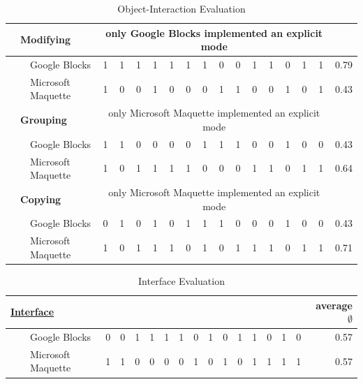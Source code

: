 \documentclass{report}
\begin{document}
\begin{table}[H]
\begin{center}
\begin{tabular}{@{}|lll|llllllllllllll|r|@{}}
				& \multicolumn{2}{l|}{\textbf{Modifying}} & \multicolumn{14}{c|}{\small{only Google Blocks implemented an explicit mode}} &\\ \hline
				& & Google Blocks & 1 & 1 & 1 & 1 & 1 & 1 & 1 & 0 & 0 & 1 & 1 & 0 & 1 & 1 & 0.79\\
				& & Microsoft Maquette & 1 & 0 & 0 & 1 & 0 & 0 & 0 & 1 & 1 & 0 & 0 & 1 & 0 & 1 & 0.43 \\ \hline

				& \multicolumn{2}{l|}{\textbf{Grouping}} & \multicolumn{14}{c|}{\small{only Microsoft Maquette implemented an explicit mode}} &\\ \hline
				& & Google Blocks & 1 & 1 & 0 & 0 & 0 & 0& 1 & 1 & 1 & 0 & 0 & 1 & 0 & 0 & 0.43 \\
				& & Microsoft Maquette & 1 & 0 & 1 & 1 & 1 & 1 & 0 & 0 & 0 & 1 & 1 & 0 & 1 & 1 & 0.64 \\ \hline				
				
				& \multicolumn{2}{l|}{\textbf{Copying}} & \multicolumn{14}{c|}{\small{only Microsoft Maquette implemented an explicit mode}} &\\ \hline
				& & Google Blocks & 0 & 1 & 0 & 1 & 0 & 1 & 1 & 1 & 0 & 0 & 0 & 1 & 0 & 0 & 0.43 \\
				& & Microsoft Maquette & 1 & 0 & 1 & 1 & 1 & 0 & 1 & 0 & 1 & 1 & 1 & 0 & 1 & 1 & 0.71 \\ \hline
			\end{tabular}
			\caption{Object-Interaction Evaluation}
			\label{tab:InteractionEvaluation}
			\end{center}				
		\end{table}
		
		\begin{table}[H]
			\begin{center}
			\begin{tabular}{@{}|lll|llllllllllllll|r|@{}}
				\hline
				\multicolumn{3}{|l|}{\textbf{\underline{Interface}}} & & & & & & & & & & & & & & & \textbf{average $\emptyset$} \\ \hline
				& & Google Blocks & 0 & 0 & 1 & 1 & 1 & 1 & 0 & 1 & 0 & 1 & 1 & 0 & 1 & 0 & 0.57 \\
				& & Microsoft Maquette & 1 & 1 & 0 & 0 & 0 & 0 & 1 & 0 & 1 & 0 & 1 & 1 & 1 & 1 & 0.57 \\ \hline
			\end{tabular}
			\caption{Interface Evaluation}
			\label{tab:InterfaceEvaluation}
			\end{center}
		\end{table}
	\closesection
			
\end{document}

